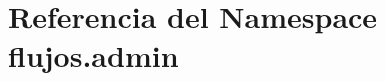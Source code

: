 \hypertarget{namespaceflujos_1_1admin}{}\section{Referencia del Namespace flujos.\+admin}
\label{namespaceflujos_1_1admin}
